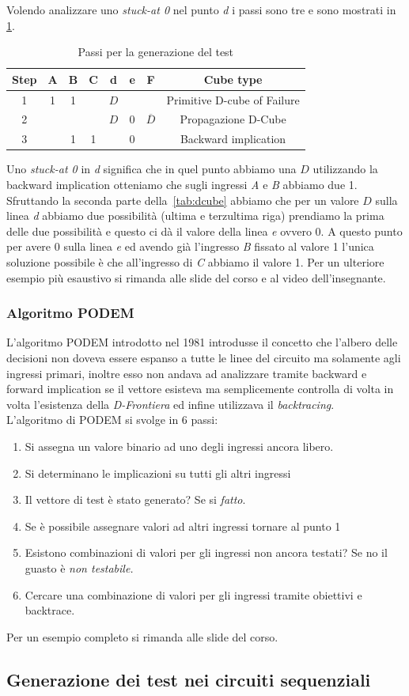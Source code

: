Volendo analizzare uno \emph{stuck-at 0} nel punto \emph{d} i passi sono tre e sono mostrati in \tablename\,\ref{tab:dalgoexe}.\\
\begin{table}
\centering
\begin{tabular}{|c|cccccc|c|}
\hline
\textbf{Step} & \textbf{A} & \textbf{B} & \textbf{C} & \textbf{d} & \textbf{e} & \textbf{F} & \textbf{Cube type}\\
\hline
1 & 1 & 1 &   & $D$ &   &   & Primitive D-cube of Failure \\
\hline
2 &   &   &   & $D$ & 0 & $\overline{D}$ & Propagazione D-Cube \\
\hline
3 &   & 1 & 1 &   & 0 &   & Backward implication \\
\hline
\end{tabular}
\caption{Passi per la generazione del test}\label{tab:dalgoexe}
\end{table}
Uno \emph{stuck-at 0} in \emph{d} significa che in quel punto abbiamo una $D$ utilizzando la backward implication otteniamo che sugli ingressi \emph{A} e \emph{B} abbiamo due 1. Sfruttando la seconda parte della \tablename\,\ref{tab:dcube} abbiamo che per un valore $D$ sulla linea \emph{d} abbiamo due possibilità (ultima e terzultima riga) prendiamo la prima delle due possibilità e questo ci dà il valore della linea \emph{e} ovvero 0. A questo punto per avere 0 sulla linea \emph{e} ed avendo già l'ingresso \emph{B} fissato al valore 1 l'unica soluzione possibile è che all'ingresso di \emph{C} abbiamo il valore 1.
Per un ulteriore esempio più esaustivo si rimanda alle slide del corso e al video dell'insegnante.
\newpage
\subsubsection{Algoritmo PODEM}
L'algoritmo PODEM introdotto nel 1981 introdusse il concetto che l'albero delle decisioni non doveva essere espanso a tutte le linee del circuito ma solamente agli ingressi primari, inoltre esso non andava ad analizzare tramite backward e forward implication se il vettore esisteva ma semplicemente controlla di volta in volta l'esistenza della \emph{D-Frontiera} ed infine utilizzava il \emph{backtracing}.\\
L'algoritmo di PODEM si svolge in 6 passi:
\begin{enumerate}
\item Si assegna un valore binario ad uno degli ingressi ancora libero.
\item Si determinano le implicazioni su tutti gli altri ingressi
\item Il vettore di test è stato generato? Se si \emph{fatto}.
\item Se è possibile assegnare valori ad altri ingressi tornare al punto 1
\item Esistono combinazioni di valori per gli ingressi non ancora testati? Se no il guasto è \emph{non testabile.}
\item Cercare una combinazione di valori per gli ingressi tramite obiettivi e backtrace.
\end{enumerate}
Per un esempio completo si rimanda alle slide del corso.
\subsection{Generazione dei test nei circuiti sequenziali}
